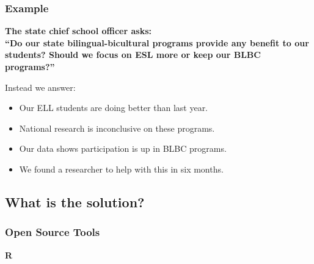 \documentclass[12pt,handout]{beamer}
\begin{document}
\begin{frame}
\frametitle{Example}
\begin{center}
\textbf{The state chief school officer asks: \\ 
``Do our state bilingual-bicultural programs provide any benefit to our students? Should we focus on ESL more or keep our BLBC programs?''}
\end{center}
\vspace{.1in}
Instead we answer:
\begin{itemize}
  \item Our ELL students are doing better than last year.
  \item National research is inconclusive on these programs.
  \item Our data shows participation is up in BLBC programs.
  \item We found a researcher to help with this in six months.
\end{itemize}
\end{frame}


\subsection{What is the solution?}

{
\begin{frame}[plain]
\frametitle{Open Source Tools}
\vspace{.3in}
\begin{center}
\Huge \textbf{R}
\end{center}
\end{frame}
}
\end{document}
